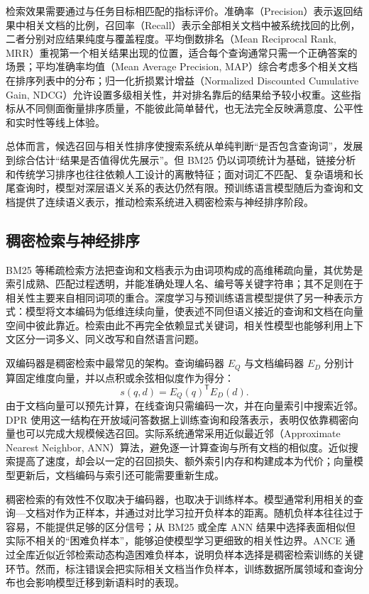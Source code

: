 检索效果需要通过与任务目标相匹配的指标评价。准确率（Precision）表示返回结果中相关文档的比例，召回率（Recall）表示全部相关文档中被系统找回的比例，二者分别对应结果纯度与覆盖程度。平均倒数排名（Mean Reciprocal Rank, MRR）重视第一个相关结果出现的位置，适合每个查询通常只需一个正确答案的场景；平均准确率均值（Mean Average Precision, MAP）综合考虑多个相关文档在排序列表中的分布；归一化折损累计增益（Normalized Discounted Cumulative Gain, NDCG）允许设置多级相关性，并对排名靠后的结果给予较小权重\parencite{jarvelin2002cg,manning2008ir}。这些指标从不同侧面衡量排序质量，不能彼此简单替代，也无法完全反映满意度、公平性和实时性等线上体验。

总体而言，候选召回与相关性排序使搜索系统从单纯判断“是否包含查询词”，发展到综合估计“结果是否值得优先展示”。但 BM25 仍以词项统计为基础，链接分析和传统学习排序也往往依赖人工设计的离散特征；面对词汇不匹配、复杂语境和长尾查询时，模型对深层语义关系的表达仍然有限。预训练语言模型随后为查询和文档提供了连续语义表示，推动检索系统进入稠密检索与神经排序阶段。

\subsection{稠密检索与神经排序}

BM25 等稀疏检索方法把查询和文档表示为由词项构成的高维稀疏向量，其优势是索引成熟、匹配过程透明，并能准确处理人名、编号等关键字符串；其不足则在于相关性主要来自相同词项的重合。深度学习与预训练语言模型提供了另一种表示方式：模型将文本编码为低维连续向量，使表述不同但语义接近的查询和文档在向量空间中彼此靠近。检索由此不再完全依赖显式关键词，相关性模型也能够利用上下文区分一词多义、同义改写和自然语言问题。

双编码器是稠密检索中最常见的架构。查询编码器 $E_Q$ 与文档编码器 $E_D$ 分别计算固定维度向量，并以点积或余弦相似度作为得分：
\begin{equation}
  s(q,d)=E_Q(q)^{\mathsf T}E_D(d).
  \label{eq:dense-retrieval}
\end{equation}
由于文档向量可以预先计算，在线查询只需编码一次，并在向量索引中搜索近邻。DPR 使用这一结构在开放域问答数据上训练查询和段落表示，表明仅依靠稠密向量也可以完成大规模候选召回\parencite{karpukhin2020dpr}。实际系统通常采用近似最近邻（Approximate Nearest Neighbor, ANN）算法，避免逐一计算查询与所有文档的相似度。近似搜索提高了速度，却会以一定的召回损失、额外索引内存和构建成本为代价；向量模型更新后，文档编码与索引还可能需要重新生成。

稠密检索的有效性不仅取决于编码器，也取决于训练样本。模型通常利用相关的查询—文档对作为正样本，并通过对比学习拉开负样本的距离。随机负样本往往过于容易，不能提供足够的区分信号；从 BM25 或全库 ANN 结果中选择表面相似但实际不相关的“困难负样本”，能够迫使模型学习更细致的相关性边界。ANCE 通过全库近似近邻检索动态构造困难负样本，说明负样本选择是稠密检索训练的关键环节\parencite{xiong2021ance}。然而，标注错误会把实际相关文档当作负样本，训练数据所属领域和查询分布也会影响模型迁移到新语料时的表现。

